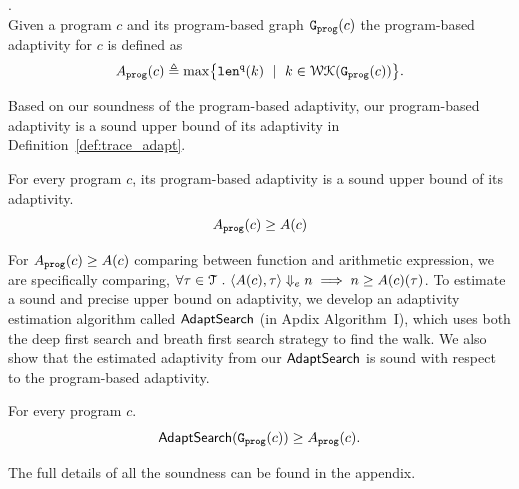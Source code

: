 %
%
%
\begin{defn}
.
\label{def:prog_adapt}
\\
{
Given a program ${c}$ and its program-based graph 
$\mathtt{{G_{prog}}}({c})$
%
the program-based adaptivity for $c$ is 
defined as%
\[
\progA({c})
\triangleq \max
\left\{ \qlen(k) \ \mid \  k \in \walks(\progG(c))\right \}.
\]
}
\end{defn}
Based on our soundness of the program-based adaptivity, our program-based adaptivity is a sound upper bound of its adaptivity in Definition~\ref{def:trace_adapt}. 
\begin{thm}
    \label{thm:sound_progadapt}
    For every program $c$, 
    its program-based adaptivity is a sound upper bound of its adaptivity.
     $$  A_{\mathtt{prog}}(c) \geq A(c)$$
\end{thm}
For $A_{\mathtt{prog}}(c) \geq A(c)$ comparing between function and arithmetic expression,
we are specifically comparing, $\forall \mathtt{\tau} \in \mathcal{T} ~.~ 
\langle A(c), \mathtt{\tau} \rangle \Downarrow_e n \implies n \geq A(c)(\mathtt{\tau}) $.
To estimate a sound and precise upper bound on adaptivity, we develop an adaptivity estimation algorithm called $\mathsf{AdaptSearch}$ (in Apdix Algorithm~I), which uses both the deep first search and breath first search strategy to find the walk. We also show that the estimated adaptivity from our $\mathsf{AdaptSearch}$ is sound with respect to the program-based adaptivity. 
\begin{thm}
    \label{thm:sound_adaptalg}
    For every program $c$.
     $$\mathsf{AdaptSearch}(\mathtt{{G_{prog}}}({c})) \geq A_{\mathtt{prog}}(c).$$
\end{thm}
The full details of all the soundness can be found in the appendix.

